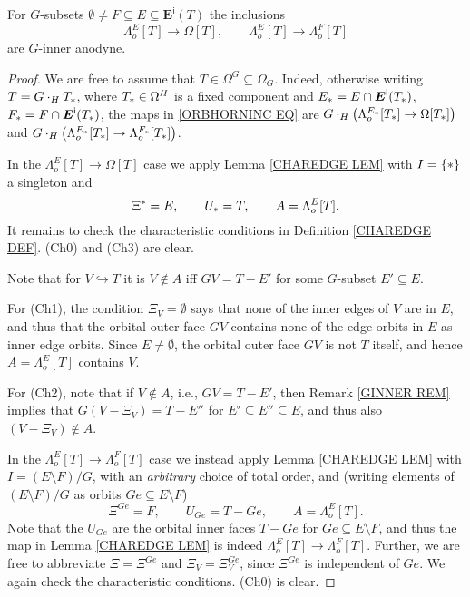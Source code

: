 \documentclass[a4paper,10pt
,draft
]{article}%
\begin{document}
\begin{proposition}\label{ORB_HORN_PROP}
	For $G$-subsets  
	$\emptyset \neq F \subseteq E \subseteq \boldsymbol{E}^{\mathsf{i}}(T)$
	the inclusions
\begin{equation}\label{ORBHORNINC EQ}
	\Lambda_o^{E}[T] \to \Omega[T],\qquad
	\Lambda_o^{E}[T] \to \Lambda_o^{F}[T]
\end{equation}
	are $G$-inner anodyne.
\end{proposition}

\begin{proof}
We are free to assume that $T \in \Omega^G \subseteq \Omega_G$. Indeed, otherwise writing $T = G \cdot_H T_{\**}$, where $T_{\**} \in \Omega^H$ is a fixed component and 
$E_{\**}=E \cap \boldsymbol{E}^{\mathsf{i}}(T_{\**})$, $F_{\**} = F \cap \boldsymbol{E}^{\mathsf{i}}(T_{\**})$,
the maps in \eqref{ORBHORNINC EQ} are
$G \cdot_H 
\left( \Lambda_o^{E_{\**}}[T_{\**}] \to \Omega[T_{\**}]\right)$
and
$G \cdot_H 
\left( \Lambda_o^{E_{\**}}[T_{\**}] \to \Lambda_o^{F_{\**}}[T_{\**}]\right)$.

In the $\Lambda_o^{E}[T] \to \Omega[T]$ case we apply
Lemma \ref{CHAREDGE LEM} with $I = \{\**\}$ a singleton and
\[
	\Xi^{\**} = E, \qquad 
	U_{\**} = T,\qquad
	A=\Lambda_o^{E}[T].
\]
It remains to check the characteristic conditions in Definition \ref{CHAREDGE DEF}.
	(Ch0) and (Ch3) are clear.

Note that for $V\hookrightarrow T$ it is $V \not \in A$ iff 
$GV = T-E'$ for some $G$-subset
$E' \subseteq E$.

For (Ch1), the condition $\Xi_{V} = \emptyset$
says that none of the inner edges of $V$ are in $E$,
and thus that the orbital outer face $G V$ contains none of the edge orbits in $E$ as inner edge orbits. Since $E \neq \emptyset$, the orbital outer face $GV$ is not $T$ itself, 
and hence $A=\Lambda_o^{E}[T]$ contains $V$.

For (Ch2), note that if $V \not \in A$, i.e., 
$GV = T - E'$, then Remark \ref{GINNER REM} implies that
$G(V-\Xi_V) = T - E''$ for $E'\subseteq E'' \subseteq E$,
and thus also $(V-\Xi_V) \not \in A$.


In the $\Lambda_o^{E}[T] \to \Lambda_o^{F}[T]$ case 
we instead apply Lemma \ref{CHAREDGE LEM} with $I = (E \setminus F)/G$, with an 
\textit{arbitrary} choice of total order, and 
(writing elements of $(E \setminus F)/G$ as orbits $Ge \subseteq E \setminus F$)
\[
	\Xi^{Ge} = F, \qquad 
	U_{G e}= T - Ge, \qquad
	A=\Lambda_o^{E}[T].
\]
Note that the $U_{Ge}$ are the orbital inner faces $T - Ge$ for $Ge \subseteq E \setminus F$, and thus the map
in Lemma \ref{CHAREDGE LEM} is indeed $\Lambda_o^{E}[T] \to \Lambda_o^{F}[T]$.
Further, we are free to abbreviate $\Xi = \Xi^{Ge}$ and $\Xi_V = \Xi^{Ge}_V$, since
$\Xi^{Ge}$ is independent of $G e$.
We again check the characteristic conditions. (Ch0) is clear.


\end{proof}
\end{document}
